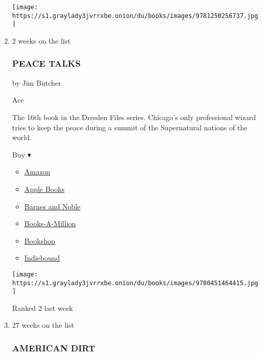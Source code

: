 \begin{enumerate}
  \texttt{[image: https://s1.graylady3jvrrxbe.onion/du/books/images/9781250256737.jpg]}
\item
  2 weeks on the list

  \hypertarget{peace-talks}{%
  \subsubsection{PEACE TALKS}\label{peace-talks}}

  by Jim Butcher

  Ace

  The 16th book in the Dresden Files series. Chicago's only professional
  wizard tries to keep the peace during a summit of the Supernatural
  nations of the world.

  Buy ▾

  \begin{itemize}
  \tightlist
  \item
    \href{https://www.amazon.com/dp/0451464419?tag=NYTBSREV-20\&tag=NYTBS-20}{Amazon}
  \item
    \href{https://du-gae-books-dot-nyt-du-prd.appspot.com/buy?title=PEACE+TALKS\&author=Jim+Butcher}{Apple
    Books}
  \item
    \href{https://www.anrdoezrs.net/click-7990613-11819508?url=https\%3A\%2F\%2Fwww.barnesandnoble.com\%2Fw\%2F\%3Fean\%3D9780451464415}{Barnes
    and Noble}
  \item
    \href{https://www.anrdoezrs.net/click-7990613-35140?url=https\%3A\%2F\%2Fwww.booksamillion.com\%2Fp\%2FPEACE\%2BTALKS\%2FJim\%2BButcher\%2F9780451464415}{Books-A-Million}
  \item
    \href{https://bookshop.org/a/3546/9780451464415}{Bookshop}
  \item
    \href{https://www.indiebound.org/book/9780451464415?aff=NYT}{Indiebound}
  \end{itemize}

  \texttt{[image: https://s1.graylady3jvrrxbe.onion/du/books/images/9780451464415.jpg]}

  Ranked 2 last week
\item
  \href{https://www.nytimes3xbfgragh.onion/2020/01/17/books/review-american-dirt-jeanine-cummins.html}{}

  27 weeks on the list

  \hypertarget{american-dirt}{%
  \subsubsection{AMERICAN DIRT}\label{american-dirt}}


\end{enumerate}
